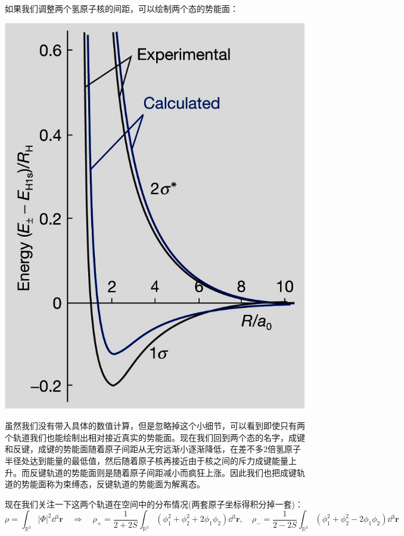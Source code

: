 如果我们调整两个氢原子核的间距，可以绘制两个态的势能面：
\begin{center}
    \includegraphics[scale=0.21]{fig/lzhx/Picture2.jpg}
\end{center}

虽然我们没有带入具体的数值计算，但是忽略掉这个小细节，可以看到即使只有两个轨道我们也能绘制出相对接近真实的势能面。现在我们回到两个态的名字，成键和反键，成键的势能面随着原子间距从无穷远渐小逐渐降低，在差不多2倍氢原子半径处达到能量的最低值，然后随着原子核再接近由于核之间的斥力成键能量上升。而反键轨道的势能面则是随着原子间距减小而疯狂上涨。因此我们也把成键轨道的势能面称为束缚态，反键轨道的势能面为解离态。

现在我们关注一下这两个轨道在空间中的分布情况(两套原子坐标得积分掉一套)：
\[\rho=\int_{\mathbb{R}^3}|\Phi|^2\dd{^3\bm{r}} \quad \Rightarrow \quad \rho_+=\frac{1}{2+2S}\int_{\mathbb{R}^3}\left(\phi_1^2+\phi_2^2+2\phi_1\phi_2\right)\dd{^3\bm{r}}, \quad \rho_-=\frac{1}{2-2S}\int_{\mathbb{R}^3}\left(\phi_1^2+\phi_2^2-2\phi_1\phi_2\right)\dd{^3\bm{r}}\]

